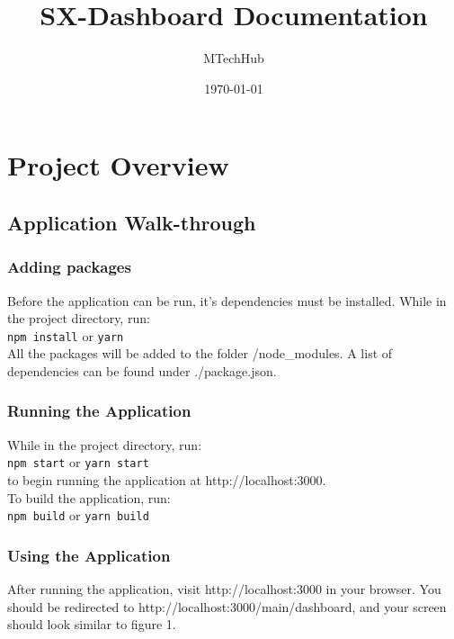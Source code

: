\documentclass[12pt, titlepage]{article}
\title{SX-Dashboard Documentation}
\author{MTechHub}
\date{\today}
\newcommand{\code}[1]{\texttt{#1}}
\begin{document}
\setlength{\arrayrulewidth}{1.5pt}

\maketitle
\newpage

\tableofcontents
\newpage
{}

\section{Project Overview}

\subsection{Application Walk-through}

\subsubsection{Adding packages}

Before the application can be run, it's dependencies must be installed. While in the project directory, run:\\
\code{npm install} or \code{yarn}\\
All the packages will be added to the folder /node\_modules. A list of dependencies can be found under ./package.json.

\subsubsection{Running the Application}

While in the project directory, run:\\
\code{npm start} or \code{yarn start}\\
to begin running the application at http://localhost:3000.\\

To build the application, run:\\
\code{npm build} or \code{yarn build}

\subsubsection{Using the Application}

After running the application, visit http://localhost:3000 in your browser. You should be redirected to http://localhost:3000/main/dashboard, and your screen should look similar to figure 1.
\end{document}
